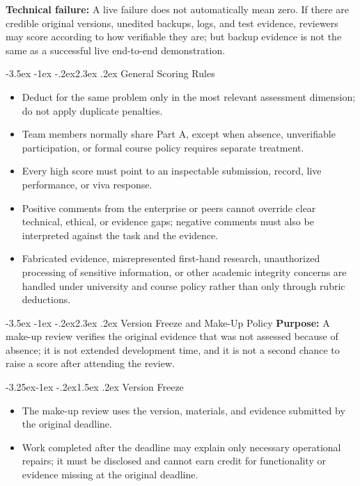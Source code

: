 \documentclass[11pt]{article}
\makeatletter
\renewcommand\section{\@startsection{section}{1}{\z@}%
    {-3.5ex \@plus -1ex \@minus -.2ex}{2.3ex \@plus.2ex}%
    {\normalfont\Large\sffamily\bfseries}}
\renewcommand\subsection{\@startsection{subsection}{2}{\z@}%
    {-3.25ex\@plus -1ex \@minus -.2ex}{1.5ex \@plus .2ex}%
    {\normalfont\large\sffamily\bfseries}}
\makeatother
\begin{document}
\noindent\textbf{Technical failure:} A live failure does not automatically mean zero. If there are credible original versions, unedited backups, logs, and test evidence, reviewers may score according to how verifiable they are; but backup evidence is not the same as a successful live end-to-end demonstration.

\section{General Scoring Rules}
\begin{itemize}
  \item Deduct for the same problem only in the most relevant assessment dimension; do not apply duplicate penalties.
  \item Team members normally share Part A, except when absence, unverifiable participation, or formal course policy requires separate treatment.
  \item Every high score must point to an inspectable submission, record, live performance, or viva response.
  \item Positive comments from the enterprise or peers cannot override clear technical, ethical, or evidence gaps; negative comments must also be interpreted against the task and the evidence.
  \item Fabricated evidence, misrepresented first-hand research, unauthorized processing of sensitive information, or other academic integrity concerns are handled under university and course policy rather than only through rubric deductions.
\end{itemize}

\section{Version Freeze and Make-Up Policy}
\noindent\textbf{Purpose:} A make-up review verifies the original evidence that was not assessed because of absence; it is not extended development time, and it is not a second chance to raise a score after attending the review.

\subsection{Version Freeze}
\begin{itemize}
  \item The make-up review uses the version, materials, and evidence submitted by the original deadline.
  \item Work completed after the deadline may explain only necessary operational repairs; it must be disclosed and cannot earn credit for functionality or evidence missing at the original deadline.
\end{itemize}
\end{document}
